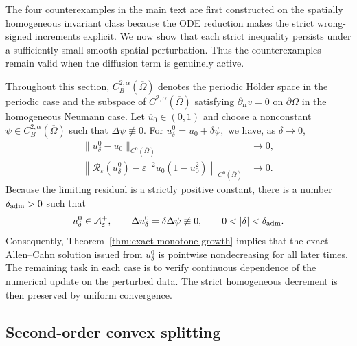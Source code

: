 \documentclass[final, 3p, times]{elsarticle}%
\newcommand{\eps}{\varepsilon}
\newcommand{\Reps}{\mathcal R_\varepsilon}
\newcommand{\Aepsp}{\mathcal A_\varepsilon^+}
\newcommand{\Aeps}{\Aepsp}
\begin{document}
The four counterexamples in the main text are first constructed on the
spatially homogeneous invariant class because the ODE reduction makes the
strict wrong-signed increments explicit. We now show that each strict
inequality persists under a sufficiently small smooth spatial perturbation.
Thus the counterexamples remain valid when the diffusion term is genuinely
active.

Throughout this section, $C_B^{2,\alpha}(\overline\Omega)$ denotes the
periodic H\"older space in the periodic case and the subspace of
$C^{2,\alpha}(\overline\Omega)$ satisfying $\partial_{\boldsymbol n}v=0$
on $\partial\Omega$ in the homogeneous Neumann case. Let
$\overline u_0\in(0,1)$ and choose a nonconstant
$\psi\in C_B^{2,\alpha}(\overline\Omega)$ such that
$\Delta\psi\not\equiv0$. For
$u^0_\delta=\overline u_0+\delta\psi,$
we have, as $\delta\to0$,
\begin{equation}
\begin{aligned}
    \|u^0_\delta-\overline u_0\|_{C^0(\overline\Omega)}&\longrightarrow0,\\
    \left\|\Reps(u^0_\delta)
    -\eps^{-2}\overline u_0(1-\overline u_0^2)\right\|_{C^0(\overline\Omega)}
    &\longrightarrow0.
\end{aligned}
\label{eq:common-perturbation-margin}
\end{equation}
Because the limiting residual is a strictly positive constant, there is a
number $\delta_{\rm adm}>0$ such that
\begin{equation}
    u^0_\delta\in\Aeps,
    \qquad
    \Delta u^0_\delta=\delta\Delta\psi\not\equiv0,
    \qquad 0<|\delta|<\delta_{\rm adm}.
\label{eq:common-perturbation-admissible}
\end{equation}
Consequently, Theorem~\ref{thm:exact-monotone-growth} implies that the exact
Allen--Cahn solution issued from $u^0_\delta$ is pointwise nondecreasing for
all later times. The remaining task in each case is to verify continuous
dependence of the numerical update on the perturbed data. The strict
homogeneous decrement is then preserved by uniform convergence.

\subsection{Second-order convex splitting}
\label{sec:CSmodCN-nonhomogeneous-persistence}
\end{document}
